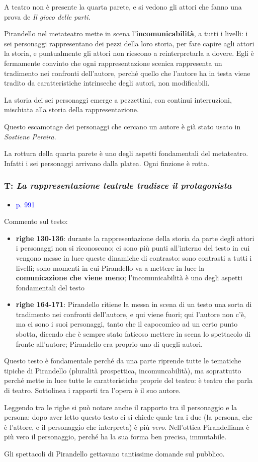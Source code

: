 \documentclass[a4paper, twoside, titlepage]{book}
\newcommand{\elenco}[1]{%
\begin{itemize}
#1
\end{itemize}}
\renewcommand{\emph}[1]{\textcolor{blue}{#1}}
\begin{document}
A teatro non è presente la quarta parete, e si vedono gli attori che fanno una prova de \textit{Il gioco delle parti}.


Pirandello nel metateatro mette in scena l’\textbf{incomunicabilità}, a tutti i livelli: i sei personaggi rappresentano dei pezzi della loro storia, per fare capire agli attori la storia, e puntualmente gli attori non riescono a reinterpretarla a dovere.
Egli è fermamente convinto che ogni rappresentazione scenica rappresenta un tradimento nei confronti dell’autore, perché quello che l’autore ha in testa viene tradito da caratteristiche intrinseche degli autori, non modificabili.

La storia dei sei personaggi emerge a pezzettini, con continui interruzioni, mischiata alla storia della rappresentazione.

Questo escamotage dei personaggi che cercano un autore è già stato usato in \textit{Sostiene Pereira}.

La rottura della quarta parete è uno degli aspetti fondamentali del metateatro. Infatti i sei personaggi arrivano dalla platea. Ogni finzione è rotta.

\subsubsection{T: \textit{La rappresentazione teatrale tradisce il protagonista}}
\elenco{\item \emph{p. 991}}

Commento sul testo:
\elenco{\item \textbf{righe 130-136}: durante la rappresentazione della storia da parte degli attori i personaggi non si riconoscono; ci sono più punti all’interno del testo in cui vengono messe in luce queste dinamiche di contrasto: sono contrasti a tutti i livelli; sono momenti in cui Pirandello va a mettere in luce la \textbf{comunicazione che viene meno}; l’incomunicabilità è uno degli aspetti fondamentali del testo
\item \textbf{righe 164-171}: Pirandello ritiene la messa in scena di un testo una sorta di tradimento nei confronti dell’autore, e qui viene fuori; qui l’autore non c’è, ma ci sono i suoi personaggi, tanto che il capocomico ad un certo punto sbotta, dicendo che è sempre stato faticoso mettere in scena lo spettacolo di fronte all’autore; Pirandello era proprio uno di quegli autori.}

Questo testo è fondamentale perché da una parte riprende tutte le tematiche tipiche di Pirandello (pluralità prospettica, incomuncabilità), ma soprattutto perché mette in luce tutte le caratteristiche proprie del teatro: è teatro che parla di teatro. Sottolinea i rapporti tra l’opera è il suo autore.

Leggendo tra le righe si può notare anche il rapporto tra il personaggio e la persona: dopo aver letto questo testo ci si chiede quale tra i due (la persona, che è l’attore, e il personaggio che interpreta) è più \textit{vero}.
Nell’ottica Pirandelliana è più vero il personaggio, perché ha la sua forma ben precisa, immutabile.

Gli spettacoli di Pirandello gettavano tantissime domande sul pubblico.
\end{document}
